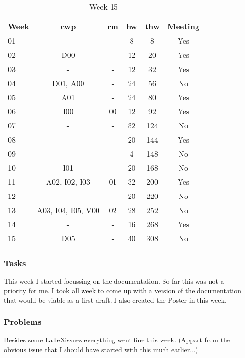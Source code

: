 \begin{table}[!ht]
    \begin{center}
        \caption{Week 15}
        \label{tab:journal:week15}
        \begin{tabular}{l|c|c|c|c|c}
            \textbf{Week} & \textbf{\gls{cwp}} & \textbf{\gls{rm}} & \textbf{\gls{hw}} & \textbf{\gls{thw}} & \textbf{Meeting}\\
        \hline
        01 & - & - & 8 & 8 & Yes \\
        02 & D00 & - & 12 & 20 & Yes \\
        03 & - & - & 12 & 32 & Yes \\
        04 & D01, A00 & - & 24 & 56 & No \\
        05 & A01 & - & 24 & 80 & Yes \\
        06 & I00 & 00 & 12 & 92 & Yes \\
        07 & - & - & 32 & 124 & No \\
        08 & - & - & 20 & 144 & Yes \\
        09 & - & - & 4 & 148 & No \\
        10 & I01 & - & 20 & 168 & No \\
        11 & A02, I02, I03 & 01 & 32 & 200 & Yes \\
        12 & - & - & 20 & 220 & No \\
        13 & A03, I04, I05, V00 & 02 & 28 & 252 & No \\
        14 & - & - & 16 & 268 & Yes \\
        15 & D05 & - & 40 & 308 & No \\
        \end{tabular}
    \end{center}
\end{table}

\subsubsection{Tasks}

This week I started focussing on the documentation. So far this was not a priority for me. I took all week to come up with a version of the documentation that would be viable as a first draft. I also created the Poster in this week. 

\subsubsection{Problems}

Besides some \LaTeX issues everything went fine this week. (Appart from the obvious issue that I should have started with this much earlier...)

